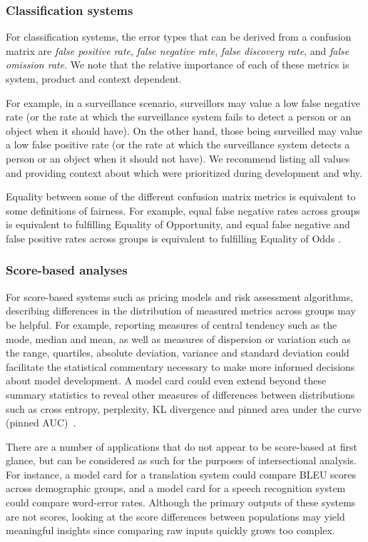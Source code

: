 \subsubsection{Classification systems}
For classification systems, the error types that can be derived from a confusion matrix are {\it false positive rate}, {\it false negative rate}, {\it false discovery rate}, and {\it false omission rate}. We note that the relative importance of each of these metrics is system, product and context dependent. 

For example, in a surveillance scenario, surveillors may value a low false negative rate (or the rate at which the surveillance system fails to detect a person or an object when it should have). On the other hand, those being surveilled may value a low false positive rate (or the rate at which the surveillance system detects a person or an object when it should not have). 
We recommend listing all values and providing context about which were prioritized during development and why.

Equality between some of the different confusion matrix metrics is equivalent to some definitions of fairness. For example, equal false negative rates across groups is equivalent to fulfilling Equality of Opportunity, and equal false negative and false positive rates across groups is equivalent to fulfilling Equality of Odds \cite{HardtEtAl2016}.

\subsubsection{Score-based analyses}
For score-based systems such as pricing models and risk assessment algorithms, describing differences in the distribution of measured metrics across groups may be helpful. For example, reporting measures of central tendency such as the mode, median and mean, as well as measures of dispersion or variation such as the range, quartiles, absolute deviation, variance and standard deviation could facilitate the statistical commentary necessary to make more informed decisions about model development. A model card could even extend beyond these summary statistics to reveal other measures of differences between distributions such as cross entropy, perplexity, KL divergence and pinned area under the curve (pinned AUC)~\cite{DixonEtAl2018}.

There are a number of applications that do not appear to be score-based at first glance, but can be considered as such for the purposes of intersectional analysis. For instance, a model card for a translation system could compare BLEU scores~\cite{bleu} across demographic groups, and a model card for a speech recognition system could compare word-error rates. Although the primary outputs of these systems are not scores, looking at the score differences between populations may yield meaningful insights since comparing raw inputs quickly grows too complex. 

